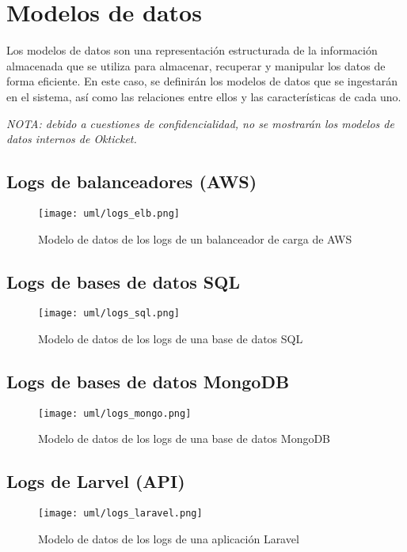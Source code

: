 \section{Modelos de datos}\label{sec:modelo}
Los modelos de datos son una representación estructurada de la información
almacenada que se utiliza para almacenar, recuperar y manipular los datos de
forma eficiente. En este caso, se definirán los modelos de datos que se
ingestarán en el sistema, así como las relaciones entre ellos y las
características de cada uno.

\emph{NOTA: debido a cuestiones de confidencialidad, no se mostrarán los modelos
de datos internos de Okticket.}

\subsection{Logs de balanceadores (AWS)}
\begin{figure}[H]
	\centering
	\texttt{[image: uml/logs\_elb.png]}
	\caption{Modelo de datos de los logs de un balanceador de carga de AWS}
	\label{fig:logs_elb}
\end{figure}


\newpage{}
\subsection{Logs de bases de datos SQL}
\begin{figure}[H]
	\centering
	\texttt{[image: uml/logs\_sql.png]}
	\caption{Modelo de datos de los logs de una base de datos SQL}
	\label{fig:logs_sql}
\end{figure}


\newpage{}
\subsection{Logs de bases de datos MongoDB}
\begin{figure}[H]
	\centering
	\texttt{[image: uml/logs\_mongo.png]}
	\caption{Modelo de datos de los logs de una base de datos MongoDB}
	\label{fig:logs_mongo}
\end{figure}


\newpage{}
\subsection{Logs de Larvel (API)}
\begin{figure}[H]
	\centering
	\texttt{[image: uml/logs\_laravel.png]}
	\caption{Modelo de datos de los logs de una aplicación Laravel}
	\label{fig:logs_laravel}
\end{figure}
